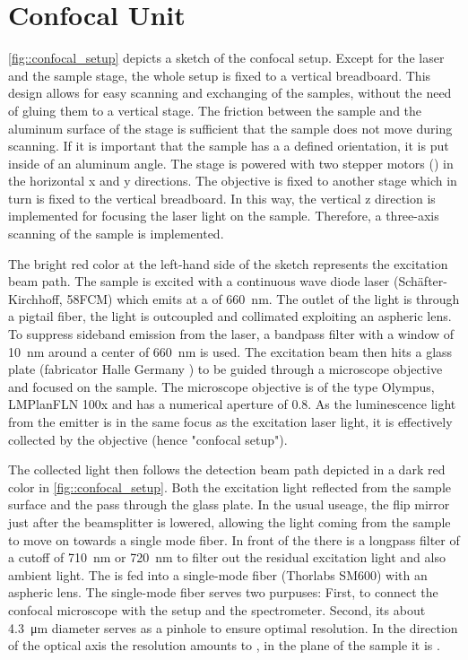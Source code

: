 	\section[Confocal Unit]{Confocal Unit} \label{sec::methods_confocal}

		\autoref{fig::confocal_setup} depicts a sketch of the confocal setup. 
		Except for the laser and the sample stage, the whole setup is fixed to a vertical breadboard. 
		This design allows for easy scanning and exchanging of the samples, without the need of gluing them to a vertical stage.
		The friction between the sample and the aluminum surface of the stage is sufficient that the sample does not move during scanning.
		If it is important that the sample has a a defined orientation, it is put inside of an aluminum angle.
		The stage is powered with two stepper motors () in the horizontal x and y directions.
		The objective is fixed to another stage which in turn is fixed to the vertical breadboard.
		In this way, the vertical z direction is implemented for focusing the laser light on the sample.
		Therefore, a three-axis scanning of the sample is implemented.

		The bright red color at the left-hand side of the sketch represents the excitation beam path.
		The sample is excited with a continuous wave diode laser (Sch\"after-Kirchhoff, 58FCM) which emits at a \wl of \SI{660}{\nano\meter}.
		The outlet of the light is through a pigtail fiber, the light is outcoupled and collimated exploiting an aspheric lens.
		To suppress sideband emission from the laser, a bandpass filter with a window of  \SI{10}{\nm} around a center of \SI{660}{\nm} is used.
		The excitation beam then hits a glass plate (fabricator Halle Germany ) to be guided through a microscope objective and focused on the sample.
		The microscope objective is of the type Olympus, LMPlanFLN 100x and has a numerical aperture of 0.8.
		As the luminescence light from the emitter is in the same focus as the excitation laser light, it is effectively collected by the objective (hence "confocal setup").

		The collected light then follows the detection beam path depicted in a dark red color in \autoref{fig::confocal_setup}.
		Both the excitation light reflected from the sample surface and the \fl pass through the glass plate.
		In the usual useage, the flip mirror just after the beamsplitter is lowered, allowing the light coming from the sample to move on towards a single mode fiber. 
		In front of the \smf there is a longpass filter of a cutoff \wl of \SI{710}{\nm} or \SI{720}{\nm} to filter out the residual excitation light and also ambient light.
		The \fl is fed into a single-mode fiber (Thorlabs SM600) with an aspheric lens.
		The single-mode fiber serves two purpuses: First, to connect the confocal microscope with the \hbt setup and the spectrometer.
		Second, its about \SI{4.3}{\micro\meter} diameter serves as a pinhole to ensure optimal resolution. 
		In the direction of the optical axis the resolution amounts to , in the plane of the sample it is .


